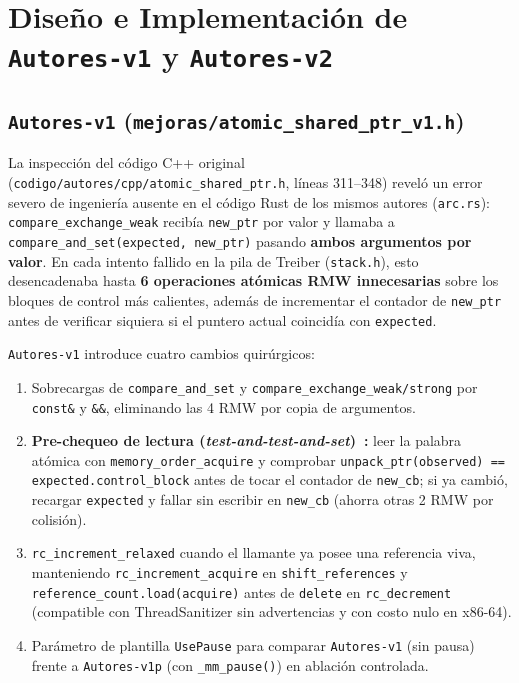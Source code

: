 \documentclass[11pt,a4paper]{article}
\begin{document}
\section{Diseño e Implementación de \texttt{Autores-v1} y \texttt{Autores-v2}}

\subsection{\texttt{Autores-v1} (\texttt{mejoras/atomic\_shared\_ptr\_v1.h})}
La inspección del código C++ original (\texttt{codigo/autores/cpp/atomic\_shared\_ptr.h}, líneas 311--348) reveló un error severo de ingeniería ausente en el código Rust de los mismos autores (\texttt{arc.rs}): \texttt{compare\_exchange\_weak} recibía \texttt{new\_ptr} por valor y llamaba a \texttt{compare\_and\_set(expected, new\_ptr)} pasando \textbf{ambos argumentos por valor}. En cada intento fallido en la pila de Treiber (\texttt{stack.h}), esto desencadenaba hasta \textbf{6 operaciones atómicas RMW innecesarias} sobre los bloques de control más calientes, además de incrementar el contador de \texttt{new\_ptr} antes de verificar siquiera si el puntero actual coincidía con \texttt{expected}.

\texttt{Autores-v1} introduce cuatro cambios quirúrgicos:
\begin{enumerate}
  \item Sobrecargas de \texttt{compare\_and\_set} y \texttt{compare\_exchange\_weak/strong} por \texttt{const\&} y \texttt{\&\&}, eliminando las 4 RMW por copia de argumentos.
  \item \textbf{Pre-chequeo de lectura (\emph{test-and-test-and-set})~\cite{mellorcrummey1991mcs}:} leer la palabra atómica con \texttt{memory\_order\_acquire} y comprobar \texttt{unpack\_ptr(observed) == expected.control\_block} antes de tocar el contador de \texttt{new\_cb}; si ya cambió, recargar \texttt{expected} y fallar sin escribir en \texttt{new\_cb} (ahorra otras 2 RMW por colisión).
  \item \texttt{rc\_increment\_relaxed} cuando el llamante ya posee una referencia viva, manteniendo \texttt{rc\_increment\_acquire} en \texttt{shift\_references} y \texttt{reference\_count.load(acquire)} antes de \texttt{delete} en \texttt{rc\_decrement} (compatible con ThreadSanitizer sin advertencias y con costo nulo en x86-64).
  \item Parámetro de plantilla \texttt{UsePause} para comparar \texttt{Autores-v1} (sin pausa) frente a \texttt{Autores-v1p} (con \texttt{\_mm\_pause()}) en ablación controlada.
\end{enumerate}
\end{document}
